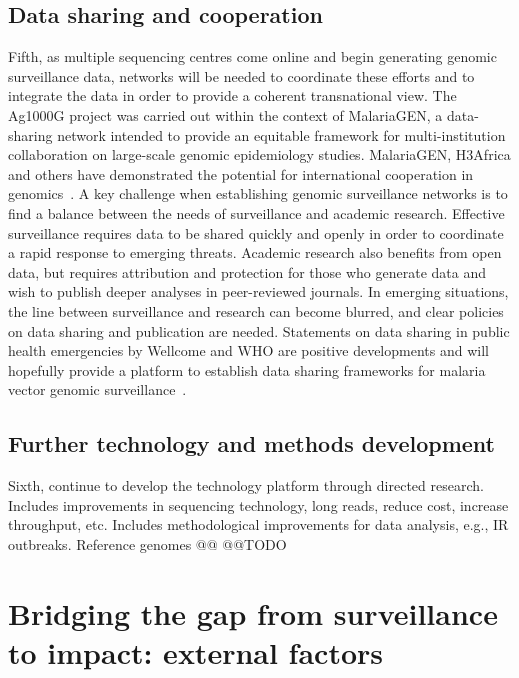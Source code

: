 \documentclass[a4paper,11pt,abstracton,hidelinks]{scrartcl}
\begin{document}
\subsection{Data sharing and cooperation}


Fifth, as multiple sequencing centres come online and begin generating genomic surveillance data, networks will be needed to coordinate these efforts and to integrate the data in order to provide a coherent transnational view.
%
The Ag1000G project was carried out within the context of MalariaGEN, a data-sharing network intended to provide an equitable framework for multi-institution collaboration on large-scale genomic epidemiology studies.
%
MalariaGEN, H3Africa and others have demonstrated the potential for international cooperation in genomics~\parencite{Mulder2018}.
%
A key challenge when establishing genomic surveillance networks is to find a balance between the needs of surveillance and academic research.
%
Effective surveillance requires data to be shared quickly and openly in order to coordinate a rapid response to emerging threats.
%
Academic research also benefits from open data, but requires attribution and protection for those who generate data and wish to publish deeper analyses in peer-reviewed journals.
%
In emerging situations, the line between surveillance and research can become blurred, and clear policies on data sharing and publication are needed.
%
Statements on data sharing in public health emergencies by Wellcome and WHO are positive developments and will hopefully provide a platform to establish data sharing frameworks for malaria vector genomic surveillance~\parencite{WHO2015SDPHE,Dye2016,Wellcome2016,Wellcome2020}.


\subsection{Further technology and methods development}


Sixth, continue to develop the technology platform through directed research.
%
Includes improvements in sequencing technology, long reads, reduce cost, increase throughput, etc.
%
Includes methodological improvements for data analysis, e.g., IR outbreaks.
%
Reference genomes @@
@@TODO


\section{Bridging the gap from surveillance to impact: external factors}\label{sec:external}
\end{document}
